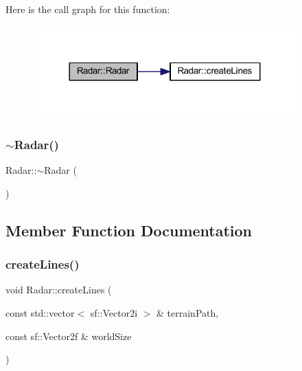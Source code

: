Here is the call graph for this function\+:
\nopagebreak
\begin{figure}[H]
\begin{center}
\leavevmode
\includegraphics[width=288pt]{class_radar_ab66bd1efe169882f4604ea10fe351330_cgraph}
\end{center}
\end{figure}
\mbox{\label{class_radar_a1989b108bc8d5b5e331c97241e622aa4}} 
\subsubsection{\texorpdfstring{$\sim$\+Radar()}{~Radar()}}
{\footnotesize\ttfamily Radar\+::$\sim$\+Radar (\begin{DoxyParamCaption}{ }\end{DoxyParamCaption})}



\subsection{Member Function Documentation}
\mbox{\label{class_radar_a1503fd82214f512677a7304abf288344}} 
\subsubsection{\texorpdfstring{create\+Lines()}{createLines()}}
{\footnotesize\ttfamily void Radar\+::create\+Lines (\begin{DoxyParamCaption}\item[{const std\+::vector$<$ sf\+::\+Vector2i $>$ \&}]{terrain\+Path,  }\item[{const sf\+::\+Vector2f \&}]{world\+Size }\end{DoxyParamCaption})}

